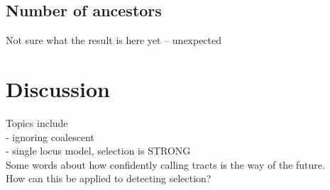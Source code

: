 \documentclass[12pt]{article}
\begin{document}
\subsection{Number of ancestors}
Not sure what the result is here yet -- unexpected

\section{Discussion}
Topics include\\
- ignoring coalescent\\
- single locus model, selection is STRONG\\

Some words about how confidently calling tracts is the way of the future.\\
How can this be applied to detecting selection?



\end{document}
